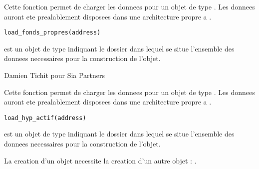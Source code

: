 \documentclass[a4paper]{book}
\begin{document}
%
\begin{Description}\relax
Cette fonction permet de charger les donnees pour un objet de type . Les donnees auront ete prealablement disposees dans
une architecture propre a .
\end{Description}
%
\begin{Usage}
\begin{verbatim}
load_fonds_propres(address)
\end{verbatim}
\end{Usage}
%
\begin{Arguments}
\begin{ldescription}
\item[\code{address}] est un objet de type  indiquant le dossier dans lequel se situe l'ensemble des donnees necessaires
pour la construction de l'objet.
\end{ldescription}
\end{Arguments}
%
\begin{Author}\relax
Damien Tichit pour Sia Partners
\end{Author}
%
\begin{Description}\relax
Cette fonction permet de charger les donnees pour un objet de type . Les donnees auront ete prealablement disposees dans
une architecture propre a .
\end{Description}
%
\begin{Usage}
\begin{verbatim}
load_hyp_actif(address)
\end{verbatim}
\end{Usage}
%
\begin{Arguments}
\begin{ldescription}
\item[\code{address}] est un objet de type  indiquant le dossier dans lequel se situe l'ensemble des donnees necessaires
pour la construction de l'objet.
\end{ldescription}
\end{Arguments}
%
\begin{Details}\relax
La creation d'un objet  necessite la creation d'un autre objet : .
\end{Details}
\end{document}
